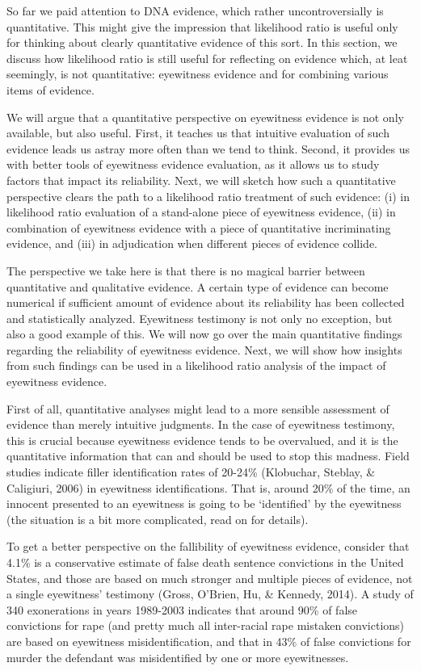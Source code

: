 \documentclass[
  10pt,
  dvipsnames,enabledeprecatedfontcommands]{scrartcl}
\begin{document}
So far we paid attention to DNA evidence, which rather uncontroversially
is quantitative. This might give the impression that likelihood ratio is
useful only for thinking about clearly quantitative evidence of this
sort. In this section, we discuss how likelihood ratio is still useful
for reflecting on evidence which, at leat seemingly, is not
quantitative: eyewitness evidence and for combining various items of
evidence.

We will argue that a quantitative perspective on eyewitness evidence is
not only available, but also useful. First, it teaches us that intuitive
evaluation of such evidence leads us astray more often than we tend to
think. Second, it provides us with better tools of eyewitness evidence
evaluation, as it allows us to study factors that impact its
reliability. Next, we will sketch how such a quantitative perspective
clears the path to a likelihood ratio treatment of such evidence: (i) in
likelihood ratio evaluation of a stand-alone piece of eyewitness
evidence, (ii) in combination of eyewitness evidence with a piece of
quantitative incriminating evidence, and (iii) in adjudication when
different pieces of evidence collide.

The perspective we take here is that there is no magical barrier between
quantitative and qualitative evidence. A certain type of evidence can
become numerical if sufficient amount of evidence about its reliability
has been collected and statistically analyzed. Eyewitness testimony is
not only no exception, but also a good example of this. We will now go
over the main quantitative findings regarding the reliability of
eyewitness evidence. Next, we will show how insights from such findings
can be used in a likelihood ratio analysis of the impact of eyewitness
evidence.

First of all, quantitative analyses might lead to a more sensible
assessment of evidence than merely intuitive judgments. In the case of
eyewitness testimony, this is crucial because eyewitness evidence tends
to be overvalued, and it is the quantitative information that can and
should be used to stop this madness. Field studies indicate filler
identification rates of 20-24\% (Klobuchar, Steblay, \& Caligiuri, 2006)
in eyewitness identifications. That is, around 20\% of the time, an
innocent presented to an eyewitness is going to be `identified' by the
eyewitness (the situation is a bit more complicated, read on for
details).

To get a better perspective on the fallibility of eyewitness evidence,
consider that 4.1\% is a conservative estimate of false death sentence
convictions in the United States, and those are based on much stronger
and multiple pieces of evidence, not a single eyewitness' testimony
(Gross, O'Brien, Hu, \& Kennedy, 2014). A study of 340 exonerations in
years 1989-2003 indicates that around 90\% of false convictions for rape
(and pretty much all inter-racial rape mistaken convictions) are based
on eyewitness misidentification, and that in 43\% of false convictions
for murder the defendant was misidentified by one or more eyewitnesses.
\end{document}
